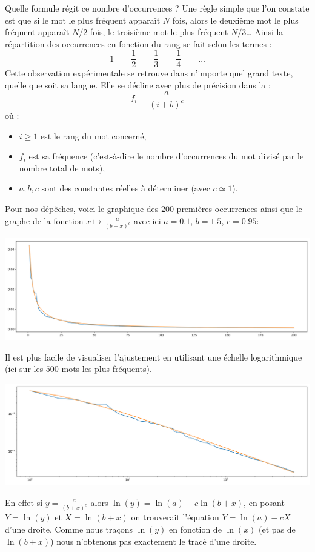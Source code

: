 \documentclass[11pt,class=report,crop=false]{standalone}
\begin{document}
Quelle formule régit ce nombre d'occurrences ?
Une règle simple que l'on constate est que si le mot le plus fréquent apparaît $N$ fois, alors le deuxième mot le plus fréquent apparaît $N/2$ fois, le troisième mot le plus fréquent $N/3$\ldots{} Ainsi la répartition des occurrences en fonction du rang se fait selon les termes :
\[ 1 \qquad \frac12 \qquad \frac13 \qquad \frac14 \qquad \ldots \]
Cette observation expérimentale se retrouve dans n'importe quel grand texte, quelle que soit sa langue.
Elle se décline avec plus de précision dans la :
\[ f_i = \frac{a}{(i+b)^c} \]
où :
\begin{itemize}
	\item $i \ge 1$ est le rang du mot concerné,
	\item $f_i$ est sa fréquence (c'est-à-dire le nombre d'occurrences du mot divisé par le nombre total de mots),
	\item $a,b,c$ sont des constantes réelles à déterminer (avec $c \simeq 1$).
\end{itemize}

Pour nos dépêches, voici le graphique des $200$ premières occurrences ainsi que le graphe de la fonction $x \mapsto \frac{a}{(b+x)^c}$ avec ici  $a=0.1$, $b=1.5$, $c=0.95$:

\begin{center}
	\includegraphics[scale=\myscale,scale=0.4]{figures/linguistique-02}
\end{center}

Il est plus facile de visualiser l'ajustement en utilisant une échelle logarithmique (ici sur les $500$ mots les plus fréquents).

\begin{center}
	\includegraphics[scale=\myscale,scale=0.4]{figures/linguistique-03}
\end{center}
En effet si $y = \frac{a}{(b+x)^c}$ alors 
$\ln(y) = \ln(a) - c \ln(b+x)$, en posant $Y = \ln(y)$ et $X = \ln(b+x)$ on trouverait l'équation $Y = \ln(a) - cX$ d'une droite. Comme nous traçons $\ln(y)$ en fonction de $\ln(x)$ (et pas de $\ln(b+x)$) nous n'obtenons pas exactement le tracé d'une droite.
\end{document}
